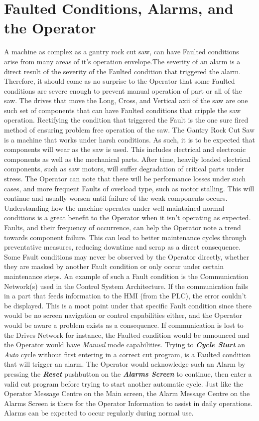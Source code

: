 \section{Faulted Conditions, Alarms, and the Operator} A machine as complex as a gantry rock cut saw, can have Faulted conditions arise from many areas of it's operation envelope.The severity of an alarm is a direct result of the severity of the Faulted condition that triggered the alarm. Therefore, it should come as no surprise to the Operator that some Faulted conditions are severe enough to prevent manual operation of part or all of the saw. The drives that move the Long, Cross, and Vertical axii of the saw are one such set of components that can have Faulted conditions that cripple the saw operation. Rectifying the condition that triggered the Fault is the one sure fired method of ensuring problem free operation of the saw. The Gantry Rock Cut Saw is a machine that works under harsh conditions. As such, it is to be expected that components will wear as the saw is used. This includes electrical and electronic components as well as the mechanical parts. After time, heavily loaded electrical components, such as saw motors, will suffer degradation of critical parts under stress. The Operator can note that there will be performance losses under such cases, and more frequent Faults of overload type, such as motor stalling. This will continue and usually worsen until failure of the weak components occurs. Understanding how the machine operates under well maintained normal conditions is a great benefit to the Operator when it isn't operating as expected. Faults, and their frequency of occurrence, can help the Operator note a trend towards component failure. This can lead to better maintenance cycles through preventative measures, reducing downtime and scrap as a direct consequence. Some Fault conditions may never be observed by the Operator directly, whether they are masked by another Fault condition or only occur under certain maintenance steps. An example of such a Fault condition is the Communication Network(s) used in the Control System Architecture. If the communication fails in a part that feeds information to the HMI (from the PLC), the error couldn't be displayed. This is a moot point under that specific Fault condition since there would be no screen navigation or control capabilities either, and the Operator would be aware a problem exists as a consequence. If communication is lost to the Drives Network for instance, the Faulted condition would be announced and the Operator would have \textit{Manual} mode capabilities. Trying to \textbf{\textit{Cycle Start}} an \textit{Auto} cycle without first entering in a correct cut program, is a Faulted condition that will trigger an alarm. The Operator would acknowledge such an Alarm by pressing the \textbf{\textit{Reset}} pushbutton on the \textbf{\textit{Alarms Screen}} to continue, then enter a valid cut program before trying to start another automatic cycle. Just like the Operator Message Centre on the Main screen, the Alarm Message Centre on the Alarms Screen is there for the Operator Information to assist in daily operations. Alarms can be expected to occur regularly during normal use. 
